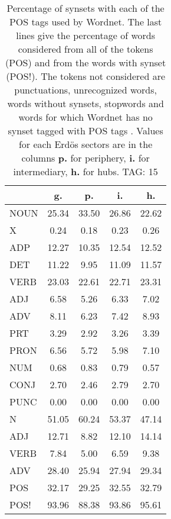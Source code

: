 \begin{table}[h!]
\begin{center}
\begin{tabular}{| l || c | c | c | c |}\hline
 & {\bf g.} & {\bf p.} & {\bf i.} & {\bf h.} \\\hline\hline
NOUN & 25.34  & 33.50  & 26.86  & 22.62 \\
X & 0.24  & 0.18  & 0.23  & 0.26 \\\hline
ADP & 12.27  & 10.35  & 12.54  & 12.52 \\
DET & 11.22  & 9.95  & 11.09  & 11.57 \\\hline
VERB & 23.03  & 22.61  & 22.71  & 23.31 \\\hline
ADJ & 6.58  & 5.26  & 6.33  & 7.02 \\
ADV & 8.11  & 6.23  & 7.42  & 8.93 \\\hline
PRT & 3.29  & 2.92  & 3.26  & 3.39 \\
PRON & 6.56  & 5.72  & 5.98  & 7.10 \\
NUM & 0.68  & 0.83  & 0.79  & 0.57 \\
CONJ & 2.70  & 2.46  & 2.79  & 2.70 \\
PUNC & 0.00  & 0.00  & 0.00  & 0.00 \\\hline\hline\hline
N & 51.05  & 60.24  & 53.37  & 47.14 \\\hline
ADJ & 12.71  & 8.82  & 12.10  & 14.14 \\\hline
VERB & 7.84  & 5.00  & 6.59  & 9.38 \\\hline
ADV & 28.40  & 25.94  & 27.94  & 29.34 \\\hline\hline
POS & 32.17  & 29.25  & 32.55  & 32.79 \\\hline
POS! & 93.96  & 88.38  & 93.86  & 95.61 \\\hline
\end{tabular}
\caption{Percentage of synsets with each of the POS tags used by Wordnet. The last lines give the percentage of words considered from all of the tokens (POS) and from the words with synset (POS!). The tokens not considered are punctuations, unrecognized words, words without synsets, stopwords and words for which Wordnet has no synset  tagged with POS tags . Values for each Erd\"os sectors are in the columns {{\bf p.}} for periphery, {{\bf i.}} for intermediary, {{\bf h.}} for hubs. TAG: 15}
\end{center}
\end{table}